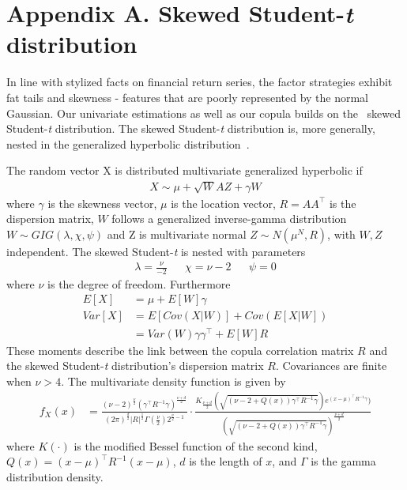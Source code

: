 \appendix
\appendixpageoff
\section{Appendix A. Skewed Student-\textit{t} distribution} \label{App:AppendixA}
In line with stylized facts on financial return series, the factor strategies exhibit fat tails and skewness - features that are poorly represented by the normal Gaussian. Our univariate estimations as well as our copula builds on the~\textcite{Hansen1994} skewed Student-\textit{t} distribution. The skewed Student-\textit{t} distribution is, more generally, nested in the generalized hyperbolic distribution~\autocite{McNeilFreyEmbrecht2005}.

The random vector X is distributed multivariate generalized hyperbolic if
\begin{align}
    X \sim \mu + \sqrt{W} A Z + \gamma W
\end{align}
where $\gamma$ is the skewness vector, $\mu$ is the location vector, $R = A A^\top$ is the dispersion matrix, $W$ follows a generalized inverse-gamma distribution $W \sim GIG(\lambda, \chi, \psi)$ and Z is multivariate normal $Z \sim N(\mu^N, R)$, with $W, Z$ independent. The skewed Student-\textit{t} is nested with parameters
\begin{align}
    \lambda = \frac{\nu}{-2} && \chi = \nu - 2 && \psi = 0
\end{align}
where $\nu$ is the degree of freedom. Furthermore
\begin{align}
    E[X] &= \mu + E[W] \gamma \\
    Var[X] &= E[Cov(X|W)] + Cov(E[X|W]) \\
    &= Var(W) \gamma \gamma^\top + E[W] R \nonumber
\end{align}
These moments describe the link between the copula correlation matrix $R$ and the skewed Student-\textit{t} distribution's dispersion matrix $R$. Covariances are finite when $\nu > 4$. The multivariate density function is given by
\begin{align} \label{eq:dskewt}
    f_X(x) &= \frac{(\nu - 2)^\frac{\nu}{2} (\gamma^\top R^{-1} \gamma)^{\frac{\nu+d}{2}}}{(2 \pi)^{\frac{d}{2}} |R|^\frac{1}{2} \Gamma (\frac{\nu}{2}) 2^{\frac{\nu}{2} - 1}} \cdot \frac{K_{\frac{\nu + d}{2}} ( \sqrt{(\nu - 2 + Q(x)) \gamma^\top R^{-1} \gamma}) e^{(x-\mu)^\top R^{-1} \gamma} )}{( \sqrt{(\nu - 2 + Q(x)) \gamma^\top R^{-1} \gamma})^{\frac{\nu + d}{2}}}
\end{align}
where $K(\cdot)$ is the modified Bessel function of the second kind, $Q(x) = (x-\mu)^\top R^{-1} (x-\mu)$, $d$ is the length of $x$, and $\Gamma$ is the gamma distribution density.

